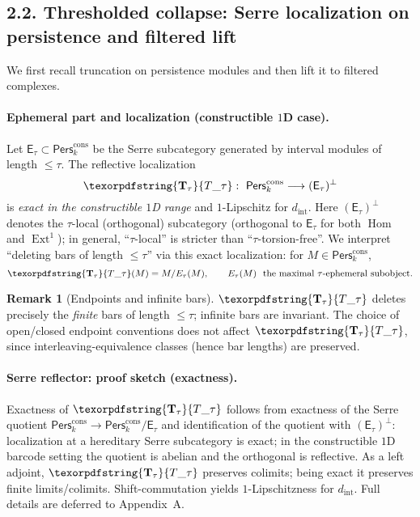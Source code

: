 \documentclass[11pt]{article}
\numberwithin{equation}{section}
\theoremstyle{plain}
\theoremstyle{definition}
\theoremstyle{remark}
\DeclareMathOperator{\Ext}{Ext}
\DeclareMathOperator{\Hom}{Hom}
\newcommand{\Pers}{\mathsf{Pers}}
\theoremstyle{plain}
\theoremstyle{definition}
\numberwithin{equation}{section}
\theoremstyle{definition}
\newtheorem{remark}[theorem]{Remark}
\DeclareRobustCommand{\Ttau}{\texorpdfstring{\ensuremath{\mathbf{T}_{\tau}}}{T\_\tau}}
\numberwithin{equation}{section}
\theoremstyle{plain}
\theoremstyle{definition}
\theoremstyle{remark}
\newcommand{\Perscons}{\Pers^{\mathrm{cons}}_k}
\newcommand{\intdist}{d_{\mathrm{int}}}
\newcommand{\Ecat}{\mathsf{E}_\tau}
\newcommand{\Orth}{(\mathsf{E}_\tau)^{\perp}}
\providecommand{\Tfun}[1]{\mathbf{T}_{#1}}
\providecommand{\Ttau}{\Tfun{\tau}}
\providecommand{\intdist}{d_{\mathrm{int}}}  %
\begin{document}
\subsection*{2.2. Thresholded collapse: Serre localization on persistence and filtered lift}
We first recall truncation on persistence modules and then lift it to filtered complexes.

\paragraph{Ephemeral part and localization (constructible \(1\)D case).}
Let \(\Ecat\subset \Perscons\) be the Serre subcategory generated by interval modules of length \(\le \tau\).
The reflective localization
\[
\Ttau:\ \Perscons\longrightarrow \Orth
\]
is \emph{exact in the constructible \(1\)D range} and \(1\)-Lipschitz for \(\intdist\). Here \(\Orth\) denotes the \(\tau\)-local (orthogonal) subcategory (orthogonal to \(\Ecat\) for both \(\Hom\) and \(\Ext^1\)); in general, ``\(\tau\)-local'' is stricter than ``\(\tau\)-torsion-free''.
We interpret “deleting bars of length \(\le\tau\)” via this exact localization: for \(M\in\Perscons\),
\[
\Ttau(M)=M/E_\tau(M),\qquad E_\tau(M)\ \text{ the maximal \(\tau\)-ephemeral subobject.}
\]

\begin{remark}[Endpoints and infinite bars]\label{rk:2-endpoints}
\(\Ttau\) deletes precisely the \emph{finite} bars of length \(\le\tau\); infinite bars are invariant. The choice of open/closed endpoint conventions does not affect \(\Ttau\), since interleaving-equivalence classes (hence bar lengths) are preserved.
\end{remark}

\paragraph{Serre reflector: proof sketch (exactness).}
Exactness of \(\Ttau\) follows from exactness of the Serre quotient \(\Perscons\to \Perscons/\Ecat\) and identification of the quotient with \(\Orth\): localization at a hereditary Serre subcategory is exact; in the constructible \(1\)D barcode setting the quotient is abelian and the orthogonal is reflective. As a left adjoint, \(\Ttau\) preserves colimits; being exact it preserves finite limits/colimits. Shift-commutation yields \(1\)-Lipschitzness for \(\intdist\). Full details are deferred to Appendix~A.
\end{document}
